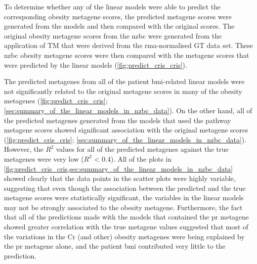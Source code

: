 To determine whether any of the linear models were able to predict the corresponding obesity metagene scores, the predicted metagene scores were generated from the models and then compared with the original scores.
The original obesity metagene scores from the \gls{nzbc} were generated from the application of TM that were derived from the \gls{rma}-normalised GT data set.
These \gls{nzbc} obesity metagene scores were then compared with the metagene scores that were predicted by the linear models (\cref{fig:predict_cris_cris}).

The predicted metagenes from all of the patient \gls{bmi}-related linear models were not significantly related to the original metagene scores in many of the obesity metagenes (\cref{fig:predict_cris_cris}; \cref{sec:summary_of_the_linear_models_in_nzbc_data}).
On the other hand, all of the predicted metagenes generated from the models that used the pathway metagene scores showed significant association with the original metagene scores (\cref{fig:predict_cris_cris}; \cref{sec:summary_of_the_linear_models_in_nzbc_data}).
However, the $R^2$ values for all of the predicted metagenes against the true metagenes were very low ($R^2$ \textless{} 0.4).
All of the plots in \cref{fig:predict_cris_cris,sec:summary_of_the_linear_models_in_nzbc_data} showed clearly that the data points in the scatter plots were highly variable, suggesting that even though the association between the predicted and the true metagene scores were statistically significant, the variables in the linear models may not be strongly associated to the obesity metagene.
Furthermore, the fact that all of the predictions made with the models that contained the \gls{pr} metagene showed greater correlation with the true metagene values suggested that most of the variations in the Cr (and other) obesity metagenes were being explained by the \gls{pr} metagene alone, and the patient \gls{bmi} contributed very little to the prediction.

